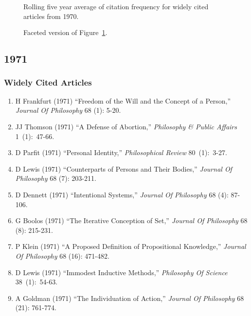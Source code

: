 \documentclass[
  10pt,
  letterpaper,
  DIV=11,
  numbers=noendperiod,
  twoside]{scrartcl}
\providecommand{\tightlist}{%
  \setlength{\itemsep}{0pt}\setlength{\parskip}{0pt}}\usepackage{longtable,booktabs,array}
\begin{document}
\begin{figure}


\caption{\label{fig-citation-spaghetti-1970}Rolling five year average of
citation frequency for widely cited articles from 1970.}

\end{figure}%

\begin{figure}


\caption{\label{fig-citation-facet-1970}Faceted version of
Figure~\ref{fig-citation-spaghetti-1970}.}

\end{figure}%

\newpage

\subsection{1971}\label{sec-s1971}

\subsubsection*{Widely Cited Articles}\label{widely-cited-articles-15}

\begin{enumerate}
\def\labelenumi{\arabic{enumi}.}
\tightlist
\item
  H Frankfurt (1971) ``Freedom of the Will and the Concept of a
  Person,'' \emph{Journal Of Philosophy} 68 (1): 5-20.
\item
  JJ Thomson (1971) ``A Defense of Abortion,'' \emph{Philosophy \&
  Public Affairs} 1~(1):~47-66.
\item
  D Parfit (1971) ``Personal Identity,'' \emph{Philosophical Review}
  80~(1):~3-27.
\item
  D Lewis (1971) ``Counterparts of Persons and Their Bodies,''
  \emph{Journal Of Philosophy} 68 (7): 203-211.
\item
  D Dennett (1971) ``Intentional Systems,'' \emph{Journal Of Philosophy}
  68 (4): 87-106.
\item
  G Boolos (1971) ``The Iterative Conception of Set,'' \emph{Journal Of
  Philosophy} 68 (8): 215-231.
\item
  P Klein (1971) ``A Proposed Definition of Propositional Knowledge,''
  \emph{Journal Of Philosophy} 68 (16): 471-482.
\item
  D Lewis (1971) ``Immodest Inductive Methods,'' \emph{Philosophy Of
  Science} 38~(1):~54-63.
\item
  A Goldman (1971) ``The Individuation of Action,'' \emph{Journal Of
  Philosophy} 68 (21): 761-774.
\end{enumerate}
\end{document}
